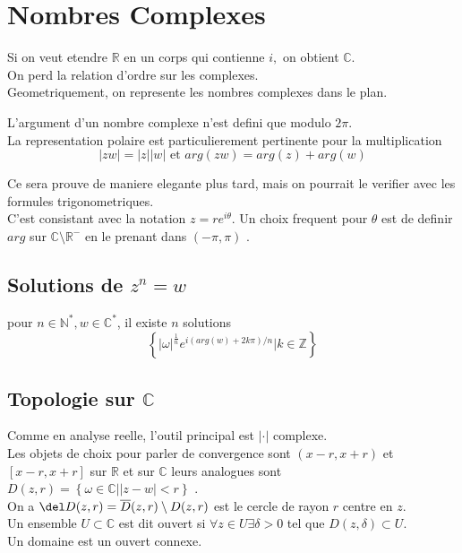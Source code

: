 \documentclass[../main.tex]{subfiles}
\begin{document}
\section{Nombres Complexes}
Si on veut etendre $\mathbb{R}$ en un corps qui contienne $i,$ on obtient $\mathbb{C}$.\\
On perd la relation d'ordre sur les complexes.\\
Geometriquement, on represente les nombres complexes dans le plan.
\begin{rmq}
L'argument d'un nombre complexe n'est defini que modulo $2\pi$.\\
La representation polaire est particulierement pertinente pour la multiplication
\[ 
	|zw| = |z||w| \text{ et } arg( zw) =arg( z) +arg( w) 
\]
\end{rmq}
Ce sera prouve de maniere elegante plus tard, mais on pourrait le verifier avec les formules trigonometriques.\\
C'est consistant avec la notation $z= r e^{i\theta} $. Un choix frequent pour $\theta$ est de definir $arg$ sur $\mathbb{C}\setminus \mathbb{R}^{-}$ en le prenant dans $( -\pi,\pi) $ .
\subsection*{Solutions de $z^{n}= w$ }
pour $n \in \mathbb{N}^{*}, w \in \mathbb{C}^{*}$, il existe $n$ solutions
\[ 
	\left\{ |\omega|^{\frac{1}{n}} e^{i (  arg( w) + 2 k \pi) / n} | k \in \mathbb{Z}  \right\} 
\]
\subsection{Topologie sur $\mathbb{C}$ }
Comme en analyse reelle, l'outil principal est $|\cdot |$ complexe.\\
Les objets de choix pour parler de convergence sont $( x-r,x+r) $ et $[ x-r,x+r]$ sur $\mathbb{R}$ et sur $\mathbb{C}$ leurs analogues sont $D( z,r) = \left\{ \omega \in \mathbb{C} | |z-w|<r \right\} $ .\\
On a $\del D( z,r) = \overline{D}( z,r) \setminus D( z,r) $ est le cercle de rayon $r$ centre en $z$.\\
Un ensemble $U \subset \mathbb{C}$ est dit ouvert si $\forall z \in U \exists \delta >0$ tel que $D( z,\delta) \subset U$.\\
Un domaine est un ouvert connexe.
\end{document}
